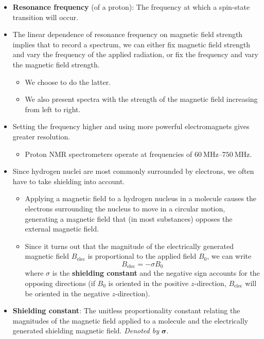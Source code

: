 \documentclass[../notes.tex]{subfiles}
\begin{document}
\begin{itemize}
\begin{itemize}
    \end{itemize}
    \item {}\textbf{Resonance frequency} (of a proton): The frequency at which a spin-state transition will occur.
    \item The linear dependence of resonance frequency on magnetic field strength implies that to record a spectrum, we can either fix magnetic field strength and vary the frequency of the applied radiation, or fix the frequency and vary the magnetic field strength.
    \begin{itemize}
        \item We choose to do the latter.
        \item We also present spectra with the strength of the magnetic field increasing from left to right.
    \end{itemize}
    \item Setting the frequency higher and using more powerful electromagnets gives greater resolution.
    \begin{itemize}
        \item Proton NMR spectrometers operate at frequencies of $\SIrange{60}{750}{\mega\hertz}$.
    \end{itemize}
    \item Since hydrogen nuclei are most commonly surrounded by electrons, we often have to take shielding into account.
    \begin{itemize}
        \item Applying a magnetic field to a hydrogen nucleus in a molecule causes the electrons surrounding the nucleus to move in a circular motion, generating a magnetic field that (in most substances) opposes the external magnetic field.
        \item Since it turns out that the magnitude of the electrically generated magnetic field $B_\text{elec}$ is proportional to the applied field $B_0$, we can write
        \begin{equation*}
            B_\text{elec} = -\sigma B_0
        \end{equation*}
        where $\sigma$ is the \textbf{shielding constant} and the negative sign accounts for the opposing directions (if $B_0$ is oriented in the positive $z$-direction, $B_\text{elec}$ will be oriented in the negative $z$-direction).
    \end{itemize}
    \item \textbf{Shielding constant}: The unitless proportionality constant relating the magnitudes of the magnetic field applied to a molecule and the electrically generated shielding magnetic field. \emph{Denoted by} $\bm{\sigma}$.

\end{itemize}
\end{document}
